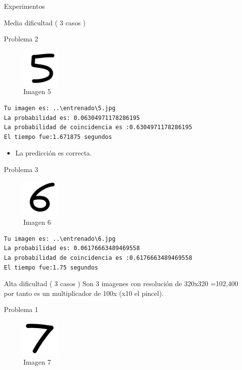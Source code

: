 \documentclass[
  spanish,
  ignorenonframetext,
]{beamer}
\providecommand{\tightlist}{%
  \setlength{\itemsep}{0pt}\setlength{\parskip}{0pt}}
\begin{document}
\begin{frame}[fragile]{Experimentos}
\begin{block}{Media dificultad ( 3 casos )}
\begin{block}{Problema 2}
\protect\hypertarget{problema-2-1}{}
\begin{figure}
\centering
\includegraphics[width=0.72917in,height=\textheight]{documentacion/img/5.png}
\caption{Imagen 5}
\end{figure}

\begin{verbatim}
Tu imagen es: ..\entrenado\5.jpg
La probabilidad es: 0.06304971178286195
La probabilidad de coincidencia es :0.6304971178286195
El tiempo fue:1.671875 segundos
\end{verbatim}

\begin{itemize}
\tightlist
\item
  La predicción es correcta.
\end{itemize}
\end{block}

\begin{block}{Problema 3}
\protect\hypertarget{problema-3-1}{}
\begin{figure}
\centering
\includegraphics[width=0.72917in,height=\textheight]{documentacion/img/6.png}
\caption{Imagen 6}
\end{figure}

\begin{verbatim}
Tu imagen es: ..\entrenado\6.jpg
La probabilidad es: 0.06176663489469558
La probabilidad de coincidencia es :0.6176663489469558
El tiempo fue:1.75 segundos
\end{verbatim}
\end{block}
\end{block}

\begin{block}{Alta dificultad ( 3 casos )}
\protect\hypertarget{alta-dificultad-3-casos}{}
Son 3 imagenes con resolución de 320x320 =102,400 por tanto es un
multiplicador de 100x (x10 el pincel).

\begin{block}{Problema 1}
\protect\hypertarget{problema-1-2}{}
\begin{figure}
\centering
\includegraphics[width=0.72917in,height=\textheight]{documentacion/img/7.png}
\caption{Imagen 7}
\end{figure}


\end{block}
\end{block}
\end{frame}
\end{document}

